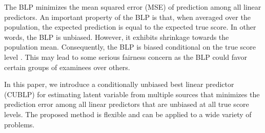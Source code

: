 \documentclass[man, floatsintext]{apa7}
\begin{document}
  The BLP minimizes the mean squared error (MSE) of prediction among all linear
  predictors. An important property of the BLP is that, when averaged over the
  population, the expected prediction is equal to the expected true score. In
  other words, the BLP is unbiased. However, it exhibits shrinkage towards
  the population mean. Consequently, the BLP is biased conditional on the true
  score level \parencite{Robinson1991}. This may lead to some serious fairness
  concern as the BLP could favor certain groups of examinees over others.

  In this paper, we introduce a conditionally unbiased best linear predictor 
  (CUBLP) for estimating latent variable from multiple sources that minimizes
  the prediction error among all linear predictors that are unbiased at all true
  score levels. The proposed method is flexible and can be applied to a wide
  variety of problems.
\end{document}
